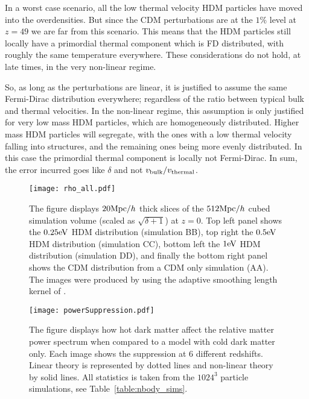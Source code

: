 \documentclass[11pt,a4paper]{article}
\renewcommand\({\left(}
\renewcommand\){\right)}
\renewcommand\[{\left[}
\renewcommand\]{\right]}
\begin{document}
In a worst case scenario, all the low thermal velocity HDM particles have moved into the overdensities. But since the CDM perturbations are at the $1\%$ level at $z=49$ we are far from this scenario. This means that the HDM particles still locally have a primordial thermal component which is FD distributed, with roughly the same temperature everywhere. These considerations do not hold, at late times, in the very non-linear regime. 

So, as long as the perturbations are linear, it is justified to assume the same Fermi-Dirac distribution everywhere; regardless of the ratio between typical bulk and thermal velocities. In the non-linear regime, this assumption is only justified for very low mass HDM particles, which are homogeneously distributed. Higher mass HDM particles will segregate, with the ones with a low thermal velocity falling into structures, and the remaining ones being more evenly distributed. In this case the primordial thermal component is locally not Fermi-Dirac. In sum, the error incurred goes like $\delta$ and not $v_{\rm bulk} / v_{\rm thermal}$.

 \begin{figure}[t]
  \vspace*{-3.8cm}
\begin{center}
\hspace*{-1.6cm}
\texttt{[image: rho\_all.pdf]}
\end{center}
 \vspace*{-4cm}
\caption{The figure displays $20 {\rm Mpc} /h$ thick slices of the $512 {\rm Mpc} / h$ cubed simulation volume (scaled as $\sqrt{\delta+1}$) at $z=0$. Top left panel shows the $0.25 {\rm eV}$ HDM distribution (simulation BB), top right the $0.5 {\rm eV}$ HDM distribution (simulation CC), bottom left the $1 {\rm eV}$ HDM distribution (simulation DD), and finally the bottom right panel shows the CDM distribution from a CDM only simulation (AA). The images were produced by using the adaptive smoothing length kernel of \cite{Monaghan:1985}.}
   \label{fig:rho_all}
\end{figure}

 \begin{figure}[t]
  \vspace*{-2.5cm}
\begin{center}
\hspace*{-1.0cm}
\texttt{[image: powerSuppression.pdf]}
\end{center}
 \vspace*{-2.5cm}
\caption{The figure displays how hot dark matter affect the relative matter power spectrum when compared to a model with cold dark matter only. Each image shows the suppression at 6 different redshifts. Linear theory is represented by dotted lines and non-linear theory by solid lines. All statistics is taken from the $1024^3$ particle simulations, see Table~\ref{table:nbody_sims}.}
   \label{fig:power_suppression}
\end{figure}
\end{document}
